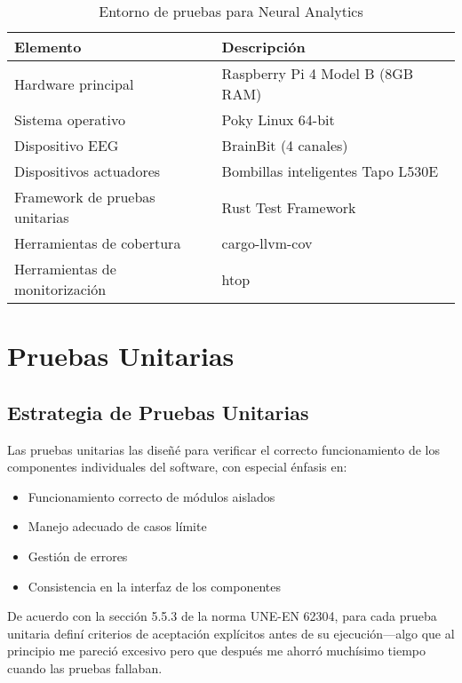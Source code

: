 \begin{table}[ht]
    \centering
    \small
    \begin{tabular}{|p{4cm}|p{8cm}|}
        \hline
        \textbf{Elemento} & \textbf{Descripción} \\
        \hline
        Hardware principal & Raspberry Pi 4 Model B (8GB RAM) \\
        \hline
        Sistema operativo & Poky Linux 64-bit \\
        \hline
        Dispositivo EEG & BrainBit (4 canales) \\
        \hline
        Dispositivos actuadores & Bombillas inteligentes Tapo L530E \\
        \hline
        Framework de pruebas unitarias & Rust Test Framework \\
        \hline
        Herramientas de cobertura & cargo-llvm-cov \\
        \hline
        Herramientas de monitorización & htop \\
        \hline
    \end{tabular}
    \caption{Entorno de pruebas para Neural Analytics}
    \label{tab:test_environment}
\end{table}

\section{Pruebas Unitarias}

\subsection{Estrategia de Pruebas Unitarias}

Las pruebas unitarias las diseñé para verificar el correcto funcionamiento de los componentes individuales del software, con especial énfasis en:

\begin{itemize}
    \item Funcionamiento correcto de módulos aislados
    \item Manejo adecuado de casos límite
    \item Gestión de errores
    \item Consistencia en la interfaz de los componentes
\end{itemize}

De acuerdo con la sección 5.5.3 de la norma UNE-EN 62304, para cada prueba unitaria definí criterios de aceptación explícitos antes de su ejecución—algo que al principio me pareció excesivo pero que después me ahorró muchísimo tiempo cuando las pruebas fallaban.


